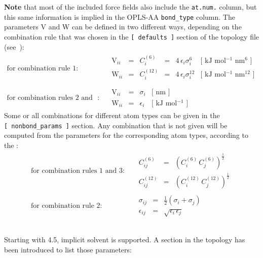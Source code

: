 {\bf Note} that most of the included force fields also include the {\tt at.num.} column, 
but this same information is implied in the OPLS-AA {\tt bond_type} column.
The parameters V and W can be defined in two different ways, depending on
the combination rule that was chosen in the {\tt [~defaults~]} section
of the topology file (see~):
\begin{eqnarray}
\mbox{for combination rule 1}: & &
\begin{array}{llllll}
  \mbox{V}_{ii} & = & C^{(6)}_{i}  & = & 4\,\epsilon_i\sigma_i^{6} &
  \mbox{[ kJ mol$^{-1}$ nm$^{6}$ ]}\\
  \mbox{W}_{ii} & = & C^{(12)}_{i} & = & 4\,\epsilon_i\sigma_i^{12} &
  \mbox{[ kJ mol$^{-1}$ nm$^{12}$ ]}\\
\end{array}
\\
\mbox{for combination rules 2 and 3}: & &
\begin{array}{llll}
  \mbox{V}_{ii} & = & \sigma_i   & \mbox{[ nm ]} \\
  \mbox{W}_{ii} & = & \epsilon_i & \mbox{[ kJ mol$^{-1}$ ]}
\end{array}
\end{eqnarray}
Some or all combinations for different atom types can be given in
the {\tt [~nonbond_params~]} section. Any combination that is
not given will be computed from the parameters for the
corresponding atom types, according to the :
\begin{eqnarray}
\mbox{for combination rules 1 and 3}: & &
\begin{array}{lll}
  C^{(6)}_{ij}  & = & \left(C^{(6)}_i\,C^{(6)}_j\right)^{\frac{1}{2}} \\
  C^{(12)}_{ij} & = & \left(C^{(12)}_i\,C^{(12)}_j\right)^{\frac{1}{2}}
\end{array}
\\
\mbox{for combination rule 2}: & &
\begin{array}{lll}
  \sigma_{ij}   & = & \frac{1}{2}(\sigma_i+\sigma_j) \\
  \epsilon_{ij} & = & \sqrt{\epsilon_i\,\epsilon_j}
\end{array}
\end{eqnarray}

\subsection{}
Starting with {\gromacs} 4.5, implicit solvent is supported. A section in the
topology has been introduced to list those parameters:

